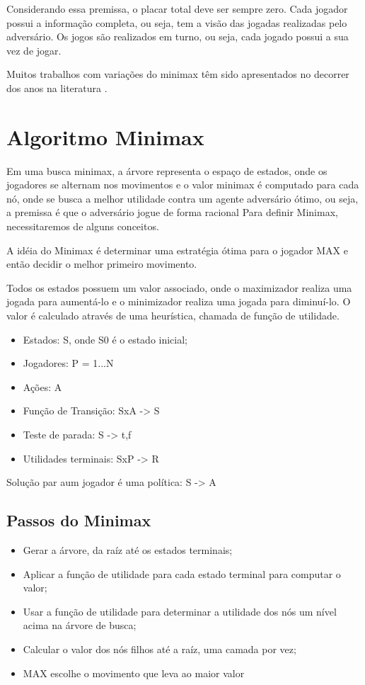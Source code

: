 \documentclass[sigplan,screen]{acmart}
\begin{document}
Considerando essa premissa, o placar total deve ser sempre zero.
Cada jogador possui a informação completa, ou seja, tem a visão das jogadas realizadas pelo adversário. Os jogos são realizados em turno, ou seja, cada jogado possui a sua vez de jogar.

Muitos trabalhos com variações do minimax têm sido apresentados no decorrer dos anos na literatura \cite{Diderich93}.

\section{Algoritmo Minimax}
Em uma busca minimax, a árvore representa o espaço de estados, onde os jogadores se alternam nos movimentos e o valor minimax é computado para cada nó, onde se busca a melhor utilidade contra um agente adversário ótimo, ou seja, a premissa é que o adversário jogue de forma racional
Para definir Minimax, necessitaremos de alguns conceitos.

A idéia do Minimax é determinar uma estratégia ótima para o jogador MAX e então decidir o melhor primeiro movimento.

Todos os estados possuem um valor associado, onde o maximizador realiza uma jogada para aumentá-lo e o minimizador realiza uma jogada para diminuí-lo. 
O valor é calculado através de uma heurística, chamada de função de utilidade.

\begin{itemize}
  \item{Estados: S, onde S0 é o estado inicial;}
  \item{Jogadores: P = {1...N}}
  \item{Ações: A}
  \item{Função de Transição: SxA -> S}
  \item{Teste de parada: S -> {t,f}}
  \item{Utilidades terminais: SxP -> R}
\end{itemize}

Solução par aum jogador é uma política: S -> A

\subsection{Passos do Minimax}

\begin{itemize}
  \item Gerar a árvore, da raíz até os estados terminais;
  \item Aplicar a função de utilidade para cada estado terminal para computar o valor;
  \item Usar a função de utilidade para determinar a utilidade dos nós um nível acima na árvore de busca;
  \item Calcular o valor dos nós filhos até a raíz, uma camada por vez;
  \item MAX escolhe o movimento que leva ao maior valor 
\end{itemize}
\end{document}
